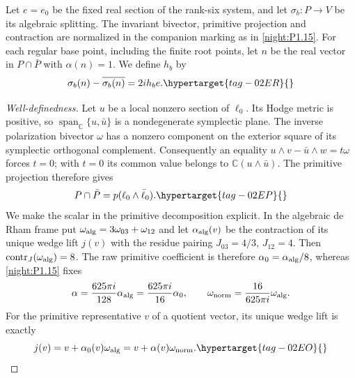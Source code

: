 \begin{definition}
\hypertarget{tag-PV03}{}\label{def:hb}
Let $e=e_0$ be the fixed real section of the rank-six system,
and let $\sigma_b:P\to V$ be its algebraic splitting.
The invariant bivector, primitive projection and contraction are
normalized in the companion marking as in \cref{night:P1.15}.
For each regular base point, including the finite root points,
let $n$ be the real vector in $P\cap\bar P$ with $\alpha(n)=1$.
We define $h_b$ by
\begin{equation}
 \sigma_b(n)-\overline{\sigma_b(n)}=2i h_b e.
 \hypertarget{tag-02ER}{}\label{maps:eq:F.20}
\end{equation}
\end{definition}
\begin{proof}[Well-definedness]
Let $u$ be a local nonzero section of $\ell_0$.
Its Hodge metric is positive, so $\operatorname{span}_{\mathbb C}\{u,\bar u\}$
is a nondegenerate symplectic plane. The inverse polarization
bivector $\omega$ has a nonzero component on the exterior square
of its symplectic orthogonal complement. Consequently an equality
$u\wedge v-\bar u\wedge w=t\omega$ forces $t=0$; with $t=0$
its common value belongs to $\mathbb C(u\wedge\bar u)$.
The primitive projection therefore gives
\begin{equation}
 P\cap\bar P=p(\ell_0\wedge\bar\ell_0).
 \hypertarget{tag-02EP}{}\label{maps:eq:F.19}
\end{equation}
We make the scalar in the primitive decomposition explicit.
In the algebraic de Rham frame put
$\omega_{\rm alg}=3\omega_{03}+\omega_{12}$ and let
$\alpha_{\rm alg}(v)$ be the contraction of its unique wedge
lift $j(v)$ with the residue pairing $J_{03}=4/3$, $J_{12}=4$. Then
$\operatorname{contr}_{J}(\omega_{\rm alg})=8$. The raw primitive
coefficient is therefore $\alpha_0=\alpha_{\rm alg}/8$, whereas
\cref{night:P1.15} fixes
\[
 \alpha=\frac{625\pi i}{128}\alpha_{\rm alg}
        =\frac{625\pi i}{16}\alpha_0,
 \qquad
 \omega_{\rm norm}=\frac{16}{625\pi i}\omega_{\rm alg}.
\]
For the primitive representative $v$ of a quotient vector, its
unique wedge lift is exactly
\begin{equation}
 j(v)=v+\alpha_0(v)\omega_{\rm alg}
     =v+\alpha(v)\omega_{\rm norm}.
 \hypertarget{tag-02EO}{}\label{maps:eq:F.18}
\end{equation}


\end{proof}
